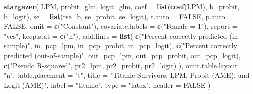 \documentclass[
  12pt,
]{article}
\newenvironment{Shaded}{\begin{snugshade}}{\end{snugshade}}
\newcommand{\DataTypeTok}[1]{\textcolor[rgb]{0.13,0.29,0.53}{#1}}
\newcommand{\KeywordTok}[1]{\textcolor[rgb]{0.13,0.29,0.53}{\textbf{#1}}}
\newcommand{\NormalTok}[1]{#1}
\newcommand{\OtherTok}[1]{\textcolor[rgb]{0.56,0.35,0.01}{#1}}
\newcommand{\StringTok}[1]{\textcolor[rgb]{0.31,0.60,0.02}{#1}}
\begin{document}
\begin{Shaded}
\begin{Highlighting}[]
\KeywordTok{stargazer}\NormalTok{(}
\NormalTok{  LPM, probit\_glm, logit\_glm,}
  \DataTypeTok{coef =} \KeywordTok{list}\NormalTok{(}\KeywordTok{coef}\NormalTok{(LPM), b\_probit, b\_logit),}
  \DataTypeTok{se =} \KeywordTok{list}\NormalTok{(rse\_b, se\_probit, se\_logit),}
  \DataTypeTok{t.auto =} \OtherTok{FALSE}\NormalTok{, }\DataTypeTok{p.auto =} \OtherTok{FALSE}\NormalTok{,}
  \DataTypeTok{omit =} \KeywordTok{c}\NormalTok{(}\StringTok{"Constant"}\NormalTok{), }\DataTypeTok{covariate.labels =} \KeywordTok{c}\NormalTok{(}\StringTok{"Female = 1"}\NormalTok{),}
  \DataTypeTok{report =} \StringTok{"vcs"}\NormalTok{, }\DataTypeTok{keep.stat =} \KeywordTok{c}\NormalTok{(}\StringTok{"n"}\NormalTok{),}
  \DataTypeTok{add.lines =} \KeywordTok{list}\NormalTok{(}
    \KeywordTok{c}\NormalTok{(}\StringTok{"Percent correctly predicted (in{-}sample)"}\NormalTok{, }
\NormalTok{      in\_pcp\_lpm, in\_pcp\_probit, in\_pcp\_logit),}
    \KeywordTok{c}\NormalTok{(}\StringTok{"Percent correctly predicted (out{-}of{-}sample)"}\NormalTok{,}
\NormalTok{      out\_pcp\_lpm, out\_pcp\_probit, out\_pcp\_logit),}
    \KeywordTok{c}\NormalTok{(}\StringTok{"Pseudo R{-}squared"}\NormalTok{, pr2\_lpm, pr2\_probit, pr2\_logit)}
\NormalTok{  ),}
  \DataTypeTok{omit.table.layout =} \StringTok{"n"}\NormalTok{, }\DataTypeTok{table.placement =} \StringTok{"t"}\NormalTok{,}
  \DataTypeTok{title =} \StringTok{"Titanic Survivors: LPM, Probit (AME), and Logit (AME)"}\NormalTok{,}
  \DataTypeTok{label =} \StringTok{"titanic"}\NormalTok{,}
  \DataTypeTok{type =} \StringTok{"latex"}\NormalTok{, }\DataTypeTok{header =} \OtherTok{FALSE}
\NormalTok{)}
\end{Highlighting}
\end{Shaded}
\end{document}
